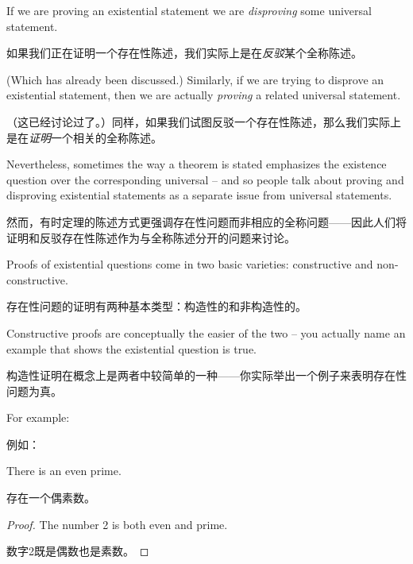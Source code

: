 If we are proving an existential statement we are \emph{disproving} some
universal statement.

如果我们正在证明一个存在性陈述，我们实际上是在\emph{反驳}某个全称陈述。

(Which has already been discussed.)  Similarly,
if we are trying to disprove an existential statement, then we are
actually \emph{proving} a related universal statement.

（这已经讨论过了。）同样，如果我们试图反驳一个存在性陈述，那么我们实际上是在\emph{证明}一个相关的全称陈述。

Nevertheless,
sometimes the way a theorem is stated emphasizes the existence question
over the corresponding universal -- and so people talk about proving
and disproving existential statements as a separate issue from 
universal statements.

然而，有时定理的陈述方式更强调存在性问题而非相应的全称问题——因此人们将证明和反驳存在性陈述作为与全称陈述分开的问题来讨论。

Proofs of existential questions come in two basic varieties: constructive
and non-constructive.

存在性问题的证明有两种基本类型：构造性的和非构造性的。

Constructive proofs are conceptually the easier
of the two -- you actually name an example that shows the existential
question is true.

构造性证明在概念上是两者中较简单的一种——你实际举出一个例子来表明存在性问题为真。

For example:

例如：

\begin{thm}
There is an even prime.

存在一个偶素数。
\end{thm}

\begin{proof}
The number 2 is both even and prime.

数字2既是偶数也是素数。
\end{proof} 

